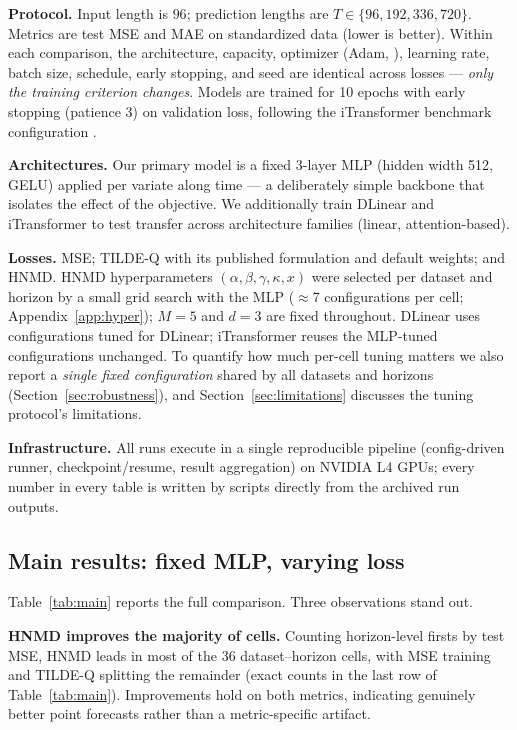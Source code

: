\documentclass[11pt,twocolumn]{article}
\newcommand{\methodName}{HNMD\xspace}
\begin{document}
\textbf{Protocol.} Input length is $96$; prediction lengths are $T \in \{96, 192, 336, 720\}$. Metrics are test MSE and MAE on standardized data (lower is better). Within each comparison, the architecture, capacity, optimizer (Adam, \citealp{kingma2014adam}), learning rate, batch size, schedule, early stopping, and seed are identical across losses --- \emph{only the training criterion changes}. Models are trained for 10 epochs with early stopping (patience 3) on validation loss, following the iTransformer benchmark configuration \citep{itransformer}.

\textbf{Architectures.} Our primary model is a fixed 3-layer MLP (hidden width 512, GELU) applied per variate along time --- a deliberately simple backbone that isolates the effect of the objective. We additionally train DLinear \citep{dlinear} and iTransformer \citep{itransformer} to test transfer across architecture families (linear, attention-based).

\textbf{Losses.} MSE; TILDE-Q \citep{tilde-q} with its published formulation and default weights; and \methodName. \methodName hyperparameters $(\alpha, \beta, \gamma, \kappa, x)$ were selected per dataset and horizon by a small grid search with the MLP ($\approx$7 configurations per cell; Appendix~\ref{app:hyper}); $M{=}5$ and $d{=}3$ are fixed throughout. DLinear uses configurations tuned for DLinear; iTransformer reuses the MLP-tuned configurations unchanged. To quantify how much per-cell tuning matters we also report a \emph{single fixed configuration} shared by all datasets and horizons (Section~\ref{sec:robustness}), and Section~\ref{sec:limitations} discusses the tuning protocol's limitations.

\textbf{Infrastructure.} All runs execute in a single reproducible pipeline (config-driven runner, checkpoint/resume, result aggregation) on NVIDIA L4 GPUs; every number in every table is written by scripts directly from the archived run outputs.

\subsection{Main results: fixed MLP, varying loss}
\label{sec:main-results}

Table~\ref{tab:main} reports the full comparison. Three observations stand out.

\textbf{\methodName improves the majority of cells.} Counting horizon-level firsts by test MSE, \methodName leads in most of the 36 dataset--horizon cells, with MSE training and TILDE-Q splitting the remainder (exact counts in the last row of Table~\ref{tab:main}). Improvements hold on both metrics, indicating genuinely better point forecasts rather than a metric-specific artifact.
\end{document}
